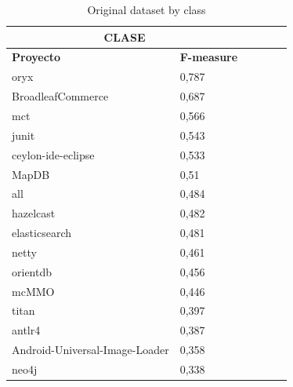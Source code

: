 \begin{table}[H]
\caption{\label{table:original_weka_class} Original dataset by class}
\begin{tabular}{llllll}
\hline
\multicolumn{2}{c}{\textbf{CLASE}}                  \\
\hline
\textbf{Proyecto}               & \textbf{F-measure} \\
\hline
oryx                           & 0,787              \\
BroadleafCommerce              & 0,687              \\
mct                            & 0,566              \\
junit                          & 0,543              \\
ceylon-ide-eclipse             & 0,533              \\
MapDB                          & 0,51               \\
all                            & 0,484              \\
hazelcast                      & 0,482              \\
elasticsearch                  & 0,481              \\
netty                          & 0,461              \\
orientdb                       & 0,456              \\
mcMMO                          & 0,446              \\
titan                          & 0,397              \\
antlr4                         & 0,387              \\
Android-Universal-Image-Loader & 0,358              \\
neo4j                          & 0,338     
\end{tabular}
\end{table}